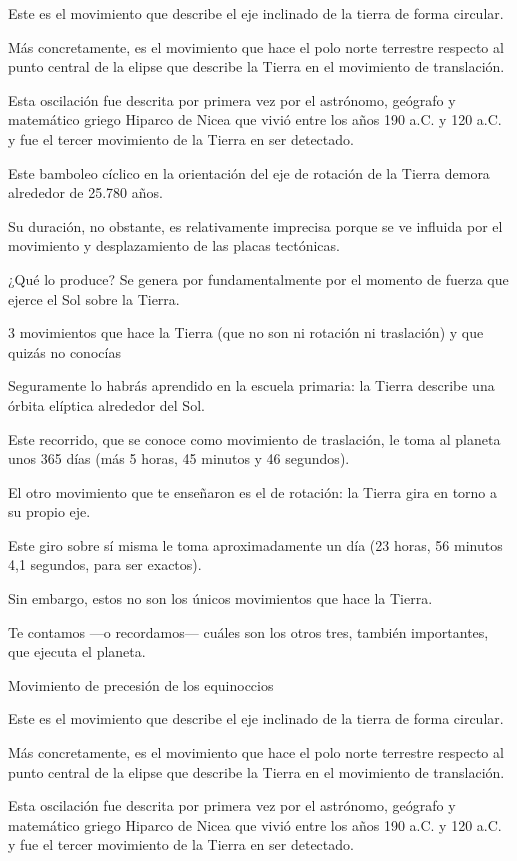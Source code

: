\documentclass[12pt,a4paper]{article}
\begin{document}
Este es el movimiento que describe el eje inclinado de la tierra de forma circular.

Más concretamente, es el movimiento que hace el polo norte terrestre respecto al punto central de la elipse 
que describe la Tierra en el movimiento de translación.

Esta oscilación fue descrita por primera vez por el astrónomo, geógrafo y matemático griego Hiparco de Nicea 
que vivió entre los años 190 a.C. y 120 a.C. y fue el tercer movimiento de la Tierra en ser detectado.
\enlargethispage*{5mm}

Este bamboleo cíclico en la orientación del eje de rotación de la Tierra demora alrededor de 25.780 años. 

Su duración, no obstante, es relativamente imprecisa porque se ve influida por el movimiento y desplazamiento 
de las placas tectónicas.

¿Qué lo produce? Se genera por fundamentalmente por el momento de fuerza que ejerce el Sol sobre la Tierra. 

3 movimientos que hace la Tierra (que no son ni rotación ni traslación) 
y que quizás no conocías


Seguramente lo habrás aprendido en la escuela primaria: la Tierra describe una órbita elíptica alrededor del Sol.

Este recorrido, que se conoce como movimiento de traslación, le toma al planeta unos 365 días 
(más 5 horas, 45 minutos y 46 segundos).

El otro movimiento que te enseñaron es el de rotación: la Tierra gira en torno a su propio eje.

Este giro sobre sí misma le toma aproximadamente un día (23 horas, 56 minutos 4,1 segundos, para ser exactos). 

Sin embargo, estos no son los únicos movimientos que hace la Tierra.

Te contamos —o recordamos— cuáles son los otros tres, también importantes, que ejecuta el planeta.





Movimiento de precesión de los equinoccios

Este es el movimiento que describe el eje inclinado de la tierra de forma circular.

Más concretamente, es el movimiento que hace el polo norte terrestre respecto al punto central de la elipse 
que describe la Tierra en el movimiento de translación.

Esta oscilación fue descrita por primera vez por el astrónomo, geógrafo y matemático griego Hiparco de Nicea 
que vivió entre los años 190 a.C. y 120 a.C. y fue el tercer movimiento de la Tierra en ser detectado.
\end{document}
